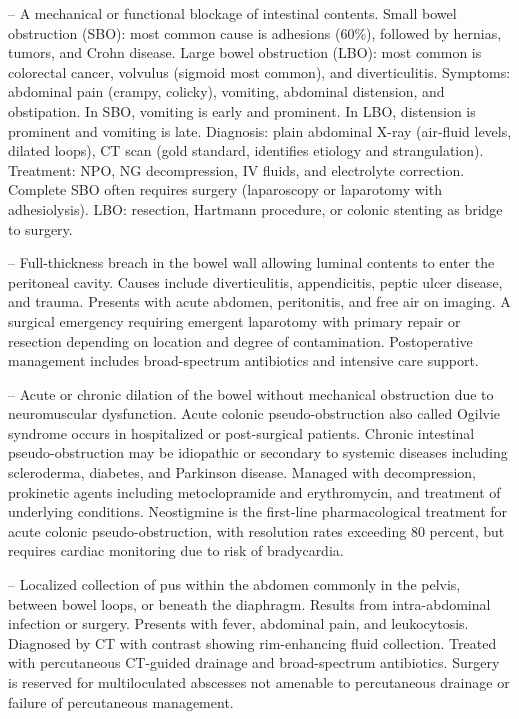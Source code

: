 -- A mechanical or functional blockage of intestinal contents. Small bowel obstruction (SBO): most common cause is adhesions (60\%), followed by hernias, tumors, and Crohn disease. Large bowel obstruction (LBO): most common is colorectal cancer, volvulus (sigmoid most common), and diverticulitis. Symptoms: abdominal pain (crampy, colicky), vomiting, abdominal distension, and obstipation. In SBO, vomiting is early and prominent. In LBO, distension is prominent and vomiting is late. Diagnosis: plain abdominal X-ray (air-fluid levels, dilated loops), CT scan (gold standard, identifies etiology and strangulation). Treatment: NPO, NG decompression, IV fluids, and electrolyte correction. Complete SBO often requires surgery (laparoscopy or laparotomy with adhesiolysis). LBO: resection, Hartmann procedure, or colonic stenting as bridge to surgery.

-- Full-thickness breach in the bowel wall allowing luminal contents to enter the peritoneal cavity. Causes include diverticulitis, appendicitis, peptic ulcer disease, and trauma. Presents with acute abdomen, peritonitis, and free air on imaging. A surgical emergency requiring emergent laparotomy with primary repair or resection depending on location and degree of contamination. Postoperative management includes broad-spectrum antibiotics and intensive care support.

-- Acute or chronic dilation of the bowel without mechanical obstruction due to neuromuscular dysfunction. Acute colonic pseudo-obstruction also called Ogilvie syndrome occurs in hospitalized or post-surgical patients. Chronic intestinal pseudo-obstruction may be idiopathic or secondary to systemic diseases including scleroderma, diabetes, and Parkinson disease. Managed with decompression, prokinetic agents including metoclopramide and erythromycin, and treatment of underlying conditions. Neostigmine is the first-line pharmacological treatment for acute colonic pseudo-obstruction, with resolution rates exceeding 80 percent, but requires cardiac monitoring due to risk of bradycardia.

-- Localized collection of pus within the abdomen commonly in the pelvis, between bowel loops, or beneath the diaphragm. Results from intra-abdominal infection or surgery. Presents with fever, abdominal pain, and leukocytosis. Diagnosed by CT with contrast showing rim-enhancing fluid collection. Treated with percutaneous CT-guided drainage and broad-spectrum antibiotics. Surgery is reserved for multiloculated abscesses not amenable to percutaneous drainage or failure of percutaneous management.

